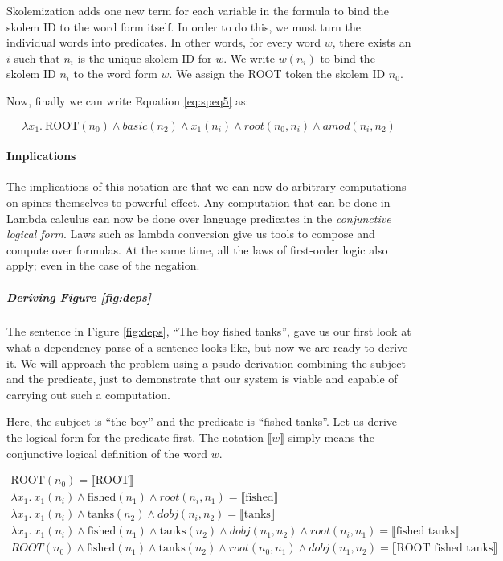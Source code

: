 \documentclass[twoside]{article}
\begin{document}
Skolemization adds one new term for each variable in the formula to bind the skolem ID to the word form itself.  In order to do this, we must turn the individual words into predicates.  In other words, for every word $w$, there exists an $i$ such that $n_i$ is the unique skolem ID for $w$.  We write $w(n_i)$ to bind the skolem ID $n_i$ to the word form $w$. We assign the ROOT token the skolem ID $n_0$.

Now, finally we can write Equation \ref{eq:speq5} as:

\begin{equation} \label{eq:speq6}
\lambda x_1.\ \text{ROOT}(n_0) \wedge basic(n_2) \wedge x_1(n_i)  \wedge root(n_0, n_i) \wedge amod (n_i, n_2)
\end{equation}

\paragraph{Implications}

The implications of this notation are that we can now do arbitrary computations on spines themselves to powerful effect.  Any computation that can be done in Lambda calculus can now be done over language predicates in the \textit{conjunctive logical form}.  Laws such as lambda conversion give us tools to compose and compute over formulas.  At the same time, all the laws of first-order logic also apply; even in the case of the negation.

\subparagraph{Deriving Figure \ref{fig:deps}}

The sentence in Figure \ref{fig:deps}, ``The boy fished tanks'', gave us our first look at what a dependency parse of a sentence looks like, but now we are ready to derive it.  We will approach the problem using a psudo-derivation combining the subject and the predicate, just to demonstrate that our system is viable and capable of carrying out such a computation.

Here, the subject is ``the boy'' and the predicate is ``fished tanks''.  Let us derive the logical form for the predicate first.  The notation $\llbracket w \rrbracket$ simply means the conjunctive logical definition of the word $w$.

\begin{eqnarray}
\text{ROOT}(n_0)=\llbracket \text{ROOT} \rrbracket \\ 
\lambda x_1.\ x_1(n_i) \wedge \text{fished}(n_1) \wedge root(n_i, n_1) = \llbracket \text{fished} \rrbracket  \\
\lambda x_1.\ x_1(n_i) \wedge \text{tanks}(n_2) \wedge dobj(n_i, n_2) = \llbracket \text{tanks} \rrbracket  \\
\lambda x_1.\ x_1(n_i) \wedge \text{fished}(n_1) \wedge \text{tanks}(n_2) \wedge dobj(n_1, n_2) \wedge root(n_i, n_1) = \llbracket \text{fished tanks} \rrbracket  \\
{ ROOT(n_0) \wedge \text{fished}(n_1) \wedge \text{tanks}(n_2) \wedge root(n_0, n_1) \wedge dobj(n_1, n_2) = \llbracket \text{ROOT fished tanks} \rrbracket \label{eq:fished_tanks} }
\end{eqnarray}
\end{document}
